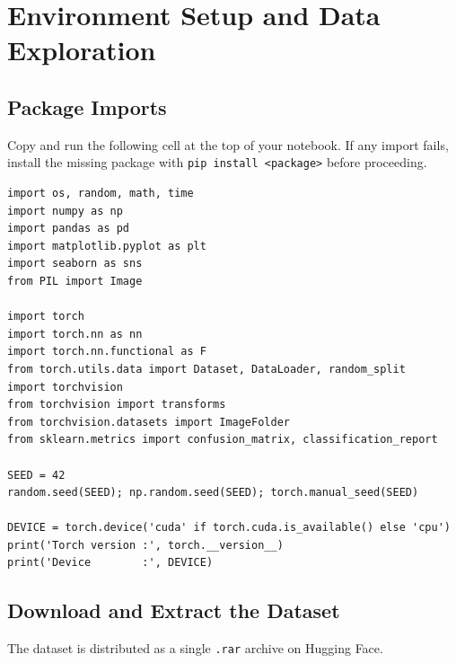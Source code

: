 \documentclass[12pt,a4paper]{article}
\begin{document}
\section{Environment Setup and Data Exploration}

\subsection{Package Imports}

Copy and run the following cell at the top of your notebook. If any import fails,
install the missing package with \texttt{pip install <package>} before proceeding.

\begin{lstlisting}[style=pythonstyle]
import os, random, math, time
import numpy as np
import pandas as pd
import matplotlib.pyplot as plt
import seaborn as sns
from PIL import Image

import torch
import torch.nn as nn
import torch.nn.functional as F
from torch.utils.data import Dataset, DataLoader, random_split
import torchvision
from torchvision import transforms
from torchvision.datasets import ImageFolder
from sklearn.metrics import confusion_matrix, classification_report

SEED = 42
random.seed(SEED); np.random.seed(SEED); torch.manual_seed(SEED)

DEVICE = torch.device('cuda' if torch.cuda.is_available() else 'cpu')
print('Torch version :', torch.__version__)
print('Device        :', DEVICE)
\end{lstlisting}

\subsection{Download and Extract the Dataset}

The dataset is distributed as a single \texttt{.rar} archive on Hugging Face.
\end{document}
